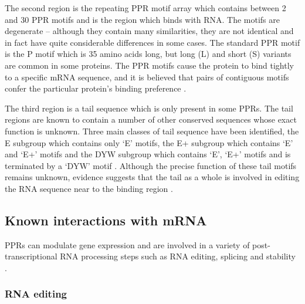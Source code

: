 The second region is the repeating PPR motif array which contains between 2 and
30 PPR motifs and is the region which binds with RNA.
The motifs are degenerate -- although they contain many similarities, they are
not identical and in fact have quite considerable differences in some cases.
The standard PPR motif is the P motif which is 35 amino acids long, 
but long (L) and short (S) variants are common in some proteins.
The PPR motifs cause the protein to bind tightly to a specific mRNA sequence,
and it is believed that pairs of contiguous motifs confer the particular
protein's binding preference \citep{Kobayashi2012}.

The third region is a tail sequence which is only present in some PPRs.
The tail regions are known to contain a number of other conserved sequences 
whose exact function is unknown.
Three main classes of tail sequence have been identified, 
the E subgroup which contains
only `E' motifs, the E+ subgroup which contains `E' and `E+' motifs and the DYW
subgroup which contains `E', `E+' motifs and is terminated by a `DYW' motif
\citep{Lurin2004}.
Although the precise function of these tail motifs remains unknown, 
evidence suggests that the tail as a whole is involved in editing the RNA
sequence near to the binding region \citep{Yagi2013a}.

\subsection{Known interactions with mRNA}

PPRs can modulate gene expression and are involved in a variety of
post-transcriptional RNA processing steps such as RNA editing, splicing and
stability \citep{Schmitz-Linneweber2008,Nakamura2012}.

\subsubsection{RNA editing}

